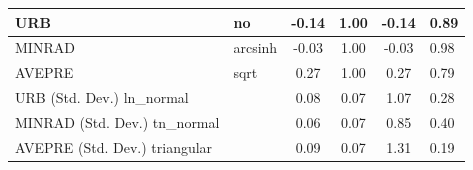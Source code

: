 \begin{table}
\begin{center}
\begin{tabular}{|l|l|c|c|c|l|}
			\hline
			URB & no & -0.14 & 1.00 & -0.14 & 0.89 \\
			\hline
			MINRAD & arcsinh & -0.03 & 1.00 & -0.03 & 0.98 \\
			\hline
			AVEPRE & sqrt & 0.27 & 1.00 & 0.27 & 0.79 \\
			\hline
			URB (Std. Dev.) ln_normal &  & 0.08 & 0.07 & 1.07 & 0.28 \\
			\hline
			MINRAD (Std. Dev.) tn_normal &  & 0.06 & 0.07 & 0.85 & 0.40 \\
			\hline
			AVEPRE (Std. Dev.) triangular &  & 0.09 & 0.07 & 1.31 & 0.19 \\
			\hline
		\end{tabular}
	\end{center}
\end{table}